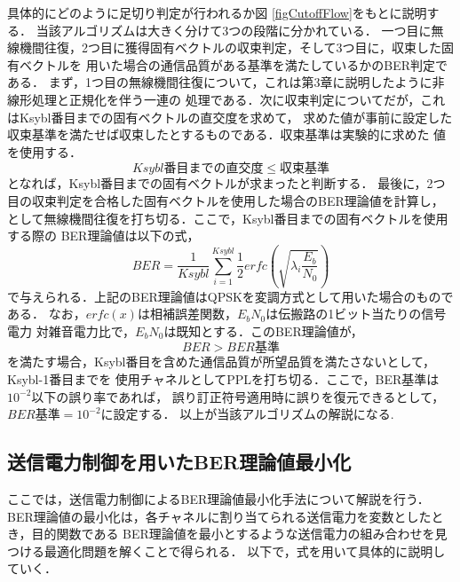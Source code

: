 具体的にどのように足切り判定が行われるか図 \ref{figCutoffFlow}をもとに説明する．
当該アルゴリズムは大きく分けて3つの段階に分かれている．
一つ目に無線機間往復，2つ目に獲得固有ベクトルの収束判定，そして3つ目に，収束した固有ベクトルを
用いた場合の通信品質がある基準を満たしているかのBER判定である．
まず，1つ目の無線機間往復について，これは第3章に説明したように非線形処理と正規化を伴う一連の
処理である．次に収束判定についてだが，これはKsybl番目までの固有ベクトルの直交度を求めて，
求めた値が事前に設定した収束基準を満たせば収束したとするものである．収束基準は実験的に求めた
値を使用する．
\begin{equation}
    Ksybl番目までの直交度 \leq 収束基準
\end{equation}
となれば，Ksybl番目までの固有ベクトルが求まったと判断する．
最後に，2つ目の収束判定を合格した固有ベクトルを使用した場合のBER理論値を計算し，
として無線機間往復を打ち切る．ここで，Ksybl番目までの固有ベクトルを使用する際の
BER理論値は以下の式，
\begin{equation}
    BER = \frac{1}{Ksybl}\sum_{i=1}^{Ksybl} \frac{1}{2}erfc\left( \sqrt{\lambda_i\frac{E_b}{N_0}} \right)
\end{equation}
で与えられる．上記のBER理論値はQPSKを変調方式として用いた場合のものである．
 \cite{akaiwa}なお，$erfc(x)$は相補誤差関数，$E_bN_0$は伝搬路の1ビット当たりの信号電力
対雑音電力比で，$E_bN_0$は既知とする．このBER理論値が，
\begin{equation}
    BER > BER基準
\end{equation}
を満たす場合，Ksybl番目を含めた通信品質が所望品質を満たさないとして，Ksybl-1番目までを
使用チャネルとしてPPLを打ち切る．ここで，BER基準は$10^{-2}$以下の誤り率であれば，
誤り訂正符号適用時に誤りを復元できるとして，$BER基準=10^{-2}$に設定する．
以上が当該アルゴリズムの解説になる.

\subsection{送信電力制御を用いたBER理論値最小化}
ここでは，送信電力制御によるBER理論値最小化手法について解説を行う．
BER理論値の最小化は，各チャネルに割り当てられる送信電力を変数としたとき，目的関数である
BER理論値を最小とするような送信電力の組み合わせを見つける最適化問題を解くことで得られる．
以下で，式を用いて具体的に説明していく．

